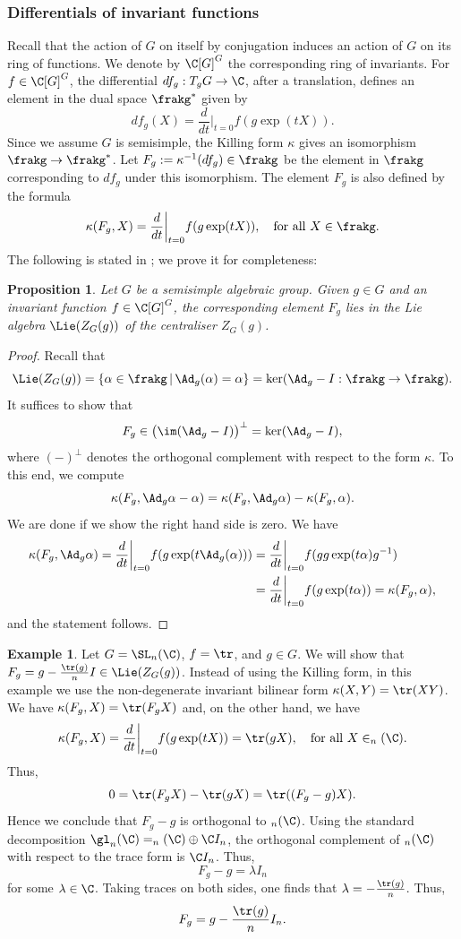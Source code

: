 \documentclass[12pt, a4paper, oneside]{amsart}
\theoremstyle{plain} %
\newtheorem{proposition}[theorem]{Proposition}
\theoremstyle{definition} %
\newtheorem{example}[theorem]{Example}
\theoremstyle{remark} %
\begin{document}
\subsubsection{Differentials of invariant functions}\label{s:differentialsofinvariantfunctions}
Recall that the action of $G$ on itself by conjugation induces an action of $G$ on its ring of functions. We denote by $\C[G]^G$ the corresponding ring of invariants. For $f\in \C[G]^G$, the differential $df_g:T_g G\to \C$, after a translation, defines an element in the dual space $\frakg^*$ given by
\[df_g(X) = \frac{d}{dt}\bigg|_{t=0}f(g\exp(tX)).\]
Since we assume $G$ is semisimple, the Killing form $\kappa$ gives an isomorphism $\frakg \to \frakg^*$. Let $F_g:=\kappa^{-1}(df_g)\in \frakg$ be the element in $\frakg$ corresponding to $df_g$ under this isomorphism. The element $F_g$ is also defined by the formula
\[\kappa(F_g, X) = \frac{d}{dt}\bigg|_{t=0}f(g\exp(tX)),\quad \text{for all}\,\,X\in \frakg.\]
The following is stated in \cite[page 264]{Gol86}; we prove it for completeness:
\begin{proposition}\label{prop:differentialinvariantfunction}
Let $G$ be a semisimple algebraic group. Given $g\in G$ and an invariant function $f\in \C[G]^G$, the corresponding element $F_g$ lies in the Lie algebra $\Lie(Z_G(g))$ of the centraliser $Z_G(g)$.
\end{proposition}
\begin{proof}
Recall that 
\[\Lie(Z_G(g)) = \{\alpha\in \frakg\,|\, \Ad_g(\alpha) = \alpha\} = \ker(\Ad_g-I:\frakg\to \frakg).\]
It suffices to show that 
\[F_g\in \bigl(\im(\Ad_g-I)\bigr)^\perp= \ker(\Ad_g - I),\]
where $(-)^\perp$ denotes the orthogonal complement with respect to the form $\kappa$.
To this end, we compute
\[\kappa(F_g, \Ad_g\alpha - \alpha) = \kappa(F_g, \Ad_g\alpha) -\kappa(F_g, \alpha).\]
We are done if we show the right hand side is zero.
We have
\begin{align*}
\kappa(F_g,\Ad_g\alpha) = \frac{d}{dt}\bigg|_{t=0}f(g\exp(t\Ad_g(\alpha)))&=\frac{d}{dt}\bigg|_{t=0}f(gg\exp(t\alpha)g^{-1})\\
&=\frac{d}{dt}\bigg|_{t=0}f(g\exp(t\alpha)) = \kappa(F_g,\alpha),
\end{align*}
and the statement follows.
\end{proof}


\begin{example}
Let $G=\SL_n(\C)$, $f=\tr$, and $g\in G$. We will show that $F_{g} = g-\frac{\tr(g)}{n}I\in \Lie(Z_G(g))$. Instead of using the Killing form, in this example we use the non-degenerate invariant bilinear form $\kappa(X,Y)=\tr(XY)$. We have $\kappa(F_g,X ) = \tr(F_g X)$ and, on the other hand, we have
\[\kappa(F_g, X) = \frac{d}{dt}\bigg|_{t=0}f(g\exp(tX)) = \tr(gX),\quad \text{for all}\,\,X\in \sl_n(\C).\]
Thus, 
\[0=\tr(F_g X)-\tr(gX) = \tr((F_g - g)X).\]
Hence we conclude that $F_g - g$ is orthogonal to $\sl_n(\C)$. Using the standard decomposition $\gl_n(\C)  = \sl_n(\C) \oplus \C I_n$, the orthogonal complement of $\sl_n(\C)$ with respect to the trace form is $\C I_n$. Thus,
\[F_g-g=\lambda I_n\]
for some $\lambda\in \C$. Taking traces on both sides, one finds that $\lambda = -\frac{\tr(g)}{n}$. Thus, 
\[F_g = g-\frac{\tr(g)}{n}I_n.\]
\end{example}
\end{document}
